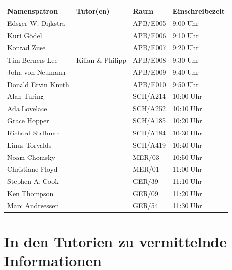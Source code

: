 \documentclass[a4paper,12pt]{report}
\begin{document}
\begin{center}
\vspace{1cm}
\begin{tabular}[h]{|l|l|l|l|}
	\hline
	\textbf{Namenspatron} & \textbf{Tutor(en)} & \textbf{Raum}& \textbf{Einschreibezeit}\\ \hline
	Edsger W. Dijkstra & & APB/E005 & 9:00 Uhr\\
	Kurt Gödel & & APB/E006 & 9:10 Uhr\\
	Konrad Zuse & & APB/E007 & 9:20 Uhr\\
	Tim Berners-Lee & Kilian \& Philipp & APB/E008 & 9:30 Uhr\\
	John von Neumann & & APB/E009 & 9:40 Uhr\\
	Donald Ervin Knuth & & APB/E010 & 9:50 Uhr\\
	Alan Turing & & SCH/A214 & 10:00 Uhr\\
	Ada Lovelace & & SCH/A252 & 10:10 Uhr\\
	Grace Hopper & & SCH/A185 & 10:20 Uhr\\
	Richard Stallman & & SCH/A184 & 10:30 Uhr\\
	Linus Torvalds & & SCH/A419 & 10:40 Uhr\\
	Noam Chomsky & & MER/03 & 10:50 Uhr\\
	Christiane Floyd & & MER/01 & 11:00 Uhr\\
	Stephen A. Cook & & GER/39 & 11:10 Uhr\\
	Ken Thompson & & GER/09 & 11:20 Uhr\\
	Marc Andreessen & & GER/54 & 11:30 Uhr\\
	\hline
\end{tabular}
\end{center}

\chapter{In den Tutorien zu vermittelnde Informationen}
\end{document}
